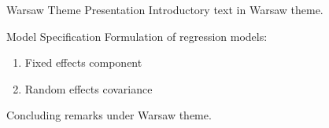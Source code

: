 \documentclass[14pt,t]{beamer}
\begin{document}
\begin{frame}{Warsaw Theme Presentation}
Introductory text in Warsaw theme.

\begin{block}{Model Specification}
Formulation of regression models:
\begin{enumerate}
\item Fixed effects component
\item Random effects covariance
\end{enumerate}
\end{block}

Concluding remarks under Warsaw theme.
\end{frame}
\end{document}
